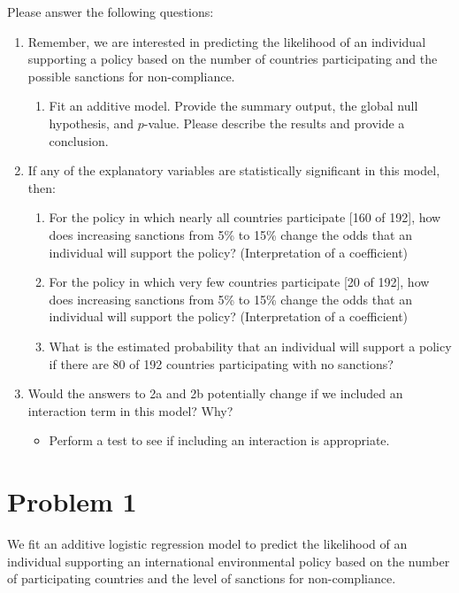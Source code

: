 \documentclass[12pt,letterpaper]{article}
\begin{document}
\newpage
\noindent Please answer the following questions:

\begin{enumerate}
	\item
	Remember, we are interested in predicting the likelihood of an individual supporting a policy based on the number of countries participating and the possible sanctions for non-compliance.
	\begin{enumerate}
		\item [] Fit an additive model. Provide the summary output, the global null hypothesis, and $p$-value. Please describe the results and provide a conclusion.

	\end{enumerate}
	
	\item
	If any of the explanatory variables are statistically significant in this model, then:
	\begin{enumerate}
		\item
		For the policy in which nearly all countries participate [160 of 192], how does increasing sanctions from 5\% to 15\% change the odds that an individual will support the policy? (Interpretation of a coefficient)
		\item
		For the policy in which very few countries participate [20 of 192], how does increasing sanctions from 5\% to 15\% change the odds that an individual will support the policy? (Interpretation of a coefficient)
		\item
		What is the estimated probability that an individual will support a policy if there are 80 of 192 countries participating with no sanctions? 
	
	\end{enumerate}
	\item
	Would the answers to 2a and 2b potentially change if we included an interaction term in this model? Why? 
	\begin{itemize}
		\item Perform a test to see if including an interaction is appropriate.
	\end{itemize}
	\end{enumerate}
\newpage
\section*{Problem 1}

\noindent We fit an additive logistic regression model to predict the likelihood of an individual supporting an international environmental policy based on the number of participating countries and the level of sanctions for non-compliance.
\vspace{1em}
\end{document}
